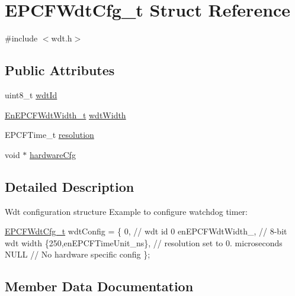 \hypertarget{structEPCFWdtCfg__t}{}\section{E\+P\+C\+F\+Wdt\+Cfg\+\_\+t Struct Reference}
\label{structEPCFWdtCfg__t}


{\ttfamily \#include $<$wdt.\+h$>$}

\subsection*{Public Attributes}
\begin{DoxyCompactItemize}
\item 
uint8\+\_\+t \mbox{\hyperlink{structEPCFWdtCfg__t_afb08d8e549acea72e3b2091c14ce1c0f}{wdt\+Id}}
\item 
\mbox{\hyperlink{wdt_8h_a8b33815c75d82ba29955d84f9aead2ab}{En\+E\+P\+C\+F\+Wdt\+Width\+\_\+t}} \mbox{\hyperlink{structEPCFWdtCfg__t_a0348efcb6bf2915041241dd217b2a307}{wdt\+Width}}
\item 
E\+P\+C\+F\+Time\+\_\+t \mbox{\hyperlink{structEPCFWdtCfg__t_a0e7100e352a728e5e840767cb9d92a24}{resolution}}
\item 
void $\ast$ \mbox{\hyperlink{structEPCFWdtCfg__t_a84516ee152df4a371dd6ebfea7418004}{hardware\+Cfg}}
\end{DoxyCompactItemize}


\subsection{Detailed Description}
Wdt configuration structure Example to configure watchdog timer\+:

\mbox{\hyperlink{structEPCFWdtCfg__t}{E\+P\+C\+F\+Wdt\+Cfg\+\_\+t}} wdt\+Config = \{ 0, // wdt id 0 en\+E\+P\+C\+F\+Wdt\+Width\+\_, // 8-\/bit wdt width \{250,en\+E\+P\+C\+F\+Time\+Unit\+\_\+ns\}, // resolution set to 0. microseconds N\+U\+LL // No hardware specific config \}; 

\subsection{Member Data Documentation}
\mbox{\label{structEPCFWdtCfg__t_a84516ee152df4a371dd6ebfea7418004}} 
